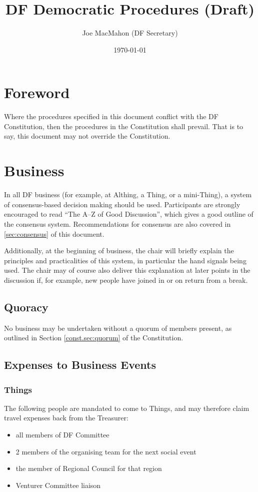 \documentclass[a4paper, 11pt]{article} %
\title{DF Democratic Procedures (Draft)}
\author{Joe MacMahon (DF Secretary)}
\date{\today}
\begin{document}
\maketitle

\tableofcontents

\section{Foreword}
Where the procedures specified in this document conflict with the DF Constitution, then the procedures in the Constitution shall prevail.  That is to say, this document may not override the Constitution.

\section{Business}
In all DF business (for example, at Althing, a Thing, or a mini-Thing), a system of consensus-based decision making should be used.  Participants are strongly encouraged to read ``The A--Z of Good Discussion'', which gives a good outline of the consensus system.  Recommendations for consensus are also covered in \autoref{sec:consensus} of this document.

Additionally, at the beginning of business, the chair will briefly explain the principles and practicalities of this system, in particular the hand signals being used.  The chair may of course also deliver this explanation at later points in the discussion if, for example, new people have joined in or on return from a break.

\subsection{Quoracy}
No business may be undertaken without a quorum of members present, as outlined in Section \autoref{const.sec:quorum} of the Constitution.

\subsection{Expenses to Business Events}
\subsubsection{Things}
The following people are mandated to come to Things, and may therefore claim travel expenses back from the Treasurer:
\begin{itemize}
\item all members of DF Committee
\item 2 members of the organising team for the next social event
\item the member of Regional Council for that region
\item Venturer Committee liaison
\end{itemize}
\end{document}
